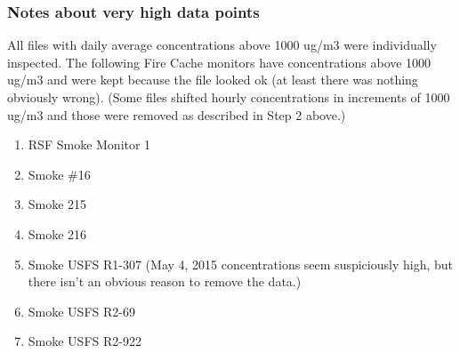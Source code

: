 \begin{enumerate}[nolistsep]
\begin{enumerate}
\end{enumerate}




\end{enumerate}

\subsubsection{Notes about very high data points}

All files with daily average concentrations above 1000 ug/m3 were individually inspected. The following Fire Cache monitors have concentrations above 1000 ug/m3 and were kept because the file looked ok (at least there was nothing obviously wrong). (Some files shifted hourly concentrations in increments of 1000 ug/m3 and those were removed as described in Step 2 above.)
\begin{enumerate}[nolistsep]
\item RSF Smoke Monitor 1
\item Smoke \#16
\item Smoke 215
\item Smoke 216
\item Smoke USFS R1-307 (May 4, 2015 concentrations seem suspiciously high, but there isn't an obvious reason to remove the data.)
\item Smoke USFS R2-69
\item Smoke USFS R2-922
\end{enumerate}

